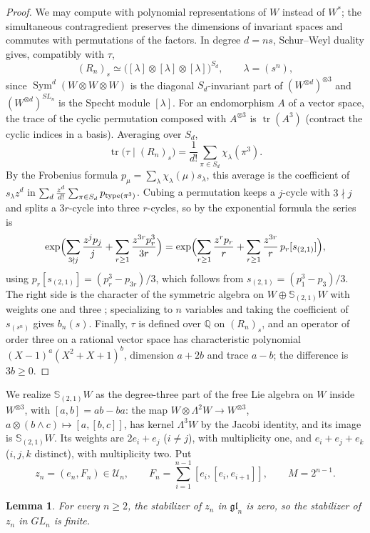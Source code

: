 \documentclass[11pt,a4paper]{article}
\newtheorem{lemma}[theorem]{Lemma}
\theoremstyle{definition}
\newcommand{\Q}{\mathbb{Q}}
\newcommand{\Sym}{\operatorname{Sym}}
\newcommand{\tr}{\operatorname{tr}}
\begin{document}
\begin{proof}
We may compute with polynomial representations of $W$ instead of $W^*$; the
simultaneous contragredient preserves the dimensions of invariant spaces and
commutes with permutations of the factors. In degree $d=ns$, Schur--Weyl
duality gives, compatibly with $\tau$,
\[
 (R_n)_s\simeq\bigl([\lambda]\otimes[\lambda]\otimes[\lambda]\bigr)^{S_d},
 \qquad\lambda=(s^n),
\]
since $\Sym^d(W\otimes W\otimes W)$ is the diagonal $S_d$-invariant part of
$(W^{\otimes d})^{\otimes3}$ and $(W^{\otimes d})^{SL_n}$ is the Specht module
$[\lambda]$. For an endomorphism $A$ of a vector space, the trace of the cyclic
permutation composed with $A^{\otimes3}$ is $\tr(A^3)$ (contract the cyclic
indices in a basis). Averaging over $S_d$,
\[
 \tr\bigl(\tau\mid(R_n)_s\bigr)=\frac1{d!}\sum_{\pi\in S_d}\chi_\lambda(\pi^3).
\]
By the Frobenius formula $p_\mu=\sum_\lambda\chi_\lambda(\mu)s_\lambda$, this
average is the coefficient of $s_\lambda z^d$ in
$\sum_d\frac{z^d}{d!}\sum_{\pi\in S_d}p_{{\rm type}(\pi^3)}$. Cubing a
permutation keeps a $j$-cycle with $3\nmid j$ and splits a $3r$-cycle into three
$r$-cycles, so by the exponential formula the series is
\[
 \exp\Bigl(\sum_{3\nmid j}\frac{z^jp_j}j+\sum_{r\ge1}\frac{z^{3r}p_r^3}{3r}\Bigr)
 =\exp\Bigl(\sum_{r\ge1}\frac{z^rp_r}r+\sum_{r\ge1}\frac{z^{3r}}r\,
 p_r[s_{(2,1)}]\Bigr),
\]
using $p_r[s_{(2,1)}]=(p_r^3-p_{3r})/3$, which follows from
$s_{(2,1)}=(p_1^3-p_3)/3$. The right side is the character of the symmetric
algebra on $W\oplus\mathbb S_{(2,1)}W$ with weights one and three
\cite[Chapter I, \S\S7--8]{Macdonald}; specializing to $n$ variables and taking
the coefficient of $s_{(s^n)}$ gives $b_n(s)$. Finally, $\tau$ is defined over
$\Q$ on $(R_n)_s$, and an operator of order three on a rational vector space has
characteristic polynomial $(X-1)^a(X^2+X+1)^b$, dimension $a+2b$ and trace
$a-b$; the difference is $3b\ge0$.
\end{proof}

We realize $\mathbb S_{(2,1)}W$ as the degree-three part of the free Lie
algebra on $W$ inside $W^{\otimes3}$, with $[a,b]=ab-ba$: the map
$W\otimes\Lambda^2W\to W^{\otimes3}$, $a\otimes(b\wedge c)\mapsto[a,[b,c]]$,
has kernel $\Lambda^3W$ by the Jacobi identity, and its image is
$\mathbb S_{(2,1)}W$. Its weights are $2e_i+e_j$ ($i\ne j$), with multiplicity
one, and $e_i+e_j+e_k$ ($i,j,k$ distinct), with multiplicity two. Put
\[
 z_n=(e_n,F_n)\in\mathcal U_n,\qquad F_n=\sum_{i=1}^{n-1}[e_i,[e_i,e_{i+1}]],
 \qquad M=2^{n-1}.
\]

\begin{lemma}\label{lem:liezero}
For every $n\ge2$, the stabilizer of $z_n$ in $\mathfrak{gl}_n$ is zero, so the
stabilizer of $z_n$ in $GL_n$ is finite.
\end{lemma}
\end{document}

